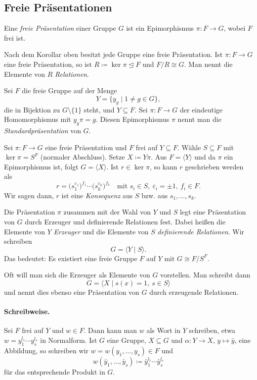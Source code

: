 \documentclass[11pt]{article}
\begin{document}
\subsection{Freie Präsentationen}

\begin{definition}\Theorem
  Eine \emph{freie Präsentation} einer Gruppe $G$ ist ein Epimorphismus $\pi\colon F \to G$, wobei $F$ frei ist.
\end{definition}

Nach dem Korollar oben besitzt jede Gruppe eine freie Präsentation. Ist $\pi\colon F \to G$ eine freie Präsentation, so ist $R \coloneqq \ker\pi \trianglelefteq F$ und $F/R \cong G$. Man nennt die Elemente von $R$ \emph{Relationen}.


\begin{example}[Standardpräsentation]
  Sei $F$ die freie Gruppe auf der Menge
  \[ Y = \{ y_g \mid 1 \neq g \in G \}, \]
  die in Bijektion zu $G \setminus \{1\}$ steht, und $Y \subseteq F$. Sei $\pi\colon F \to G$ der eindeutige Homomorphismus mit $y_g\pi = g$. Diesen Epimorphismus $\pi$ nennt man die \emph{Standardpräsentation} von $G$.
\end{example}


Sei $\pi\colon F \to G$ eine freie Präsentation und $F$ frei auf $Y \subseteq F$. Wähle $S \subseteq F$ mit $\ker\pi = S^F$ (normaler Abschluss). Setze $X \coloneqq Y\pi$. Aus $F = \langle Y \rangle$ und da $\pi$ ein Epimorphismus ist, folgt $G = \langle X \rangle$.
Ist $r \in \ker\pi$, so kann $r$ geschrieben werden als
\[ r = \bigl(s_1^{\varepsilon_1}\bigr)^{f_1} \cdots \bigl(s_k^{\varepsilon_k}\bigr)^{f_k} \quad \text{mit } s_i \in S,\ \varepsilon_i = \pm 1,\ f_i \in F. \]
Wir sagen dann, $r$ ist eine \emph{Konsequenz} aus $S$ bzw. aus $s_1, \dots, s_k$.

Die Präsentation $\pi$ zusammen mit der Wahl von $Y$ und $S$ legt eine Präsentation von $G$ durch \glqq Erzeuger und definierende Relationen\grqq{} fest. Dabei heißen die Elemente von $Y$ \emph{Erzeuger} und die Elemente von $S$ \emph{definierende Relationen}. Wir schreiben
\[ G = \langle Y \mid S \rangle. \]
Das bedeutet: Es existiert eine freie Gruppe $F$ auf $Y$ mit $G \cong F/S^F$.

Oft will man sich die Erzeuger als Elemente von $G$ vorstellen. Man schreibt dann
\[ G = \langle X \mid s(x) = 1,\ s \in S \rangle \]
und nennt dies ebenso eine Präsentation von $G$ durch erzeugende Relationen.


\paragraph{Schreibweise.}
Sei $F$ frei auf $Y$ und $w \in F$. Dann kann man $w$ als Wort in $Y$ schreiben, etwa $w = y_1^{l_1} \cdots y_s^{l_s}$ in Normalform. Ist $G$ eine Gruppe, $X \subseteq G$ und $\alpha\colon Y \to X$, $y \mapsto \bar{y}$, eine Abbildung, so schreiben wir $w = w(y_1, \dots, y_s) \in F$ und
\[ w(\bar{y}_1, \dots, \bar{y}_s) \coloneqq \bar{y}_1^{l_1} \cdots \bar{y}_s^{l_s} \]
für das entsprechende Produkt in $G$.
\end{document}
